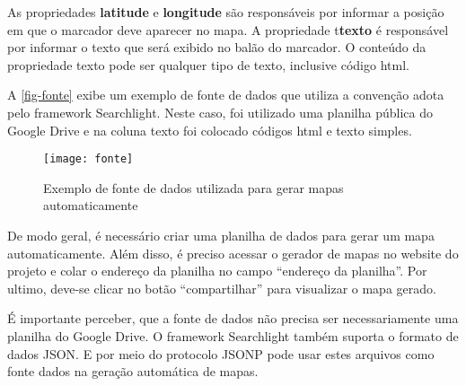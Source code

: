 As propriedades \textbf{latitude} e \textbf{longitude} são responsáveis por informar a posição em que o marcador deve aparecer no mapa. A propriedade t\textbf{texto} é responsável por informar o texto que será exibido no balão do marcador. O conteúdo da propriedade texto pode ser qualquer tipo de texto, inclusive código html.

 A \autoref{fig-fonte} exibe um exemplo de fonte de dados que utiliza a convenção adota pelo framework Searchlight. Neste caso, foi utilizado uma planilha pública do Google Drive e na coluna texto foi colocado  códigos html e texto simples. 		
  
 \begin{figure}[htb]
	\caption{\label{fig-fonte}Exemplo de fonte de dados utilizada para gerar mapas automaticamente}
	\begin{center}
	    \texttt{[image: fonte]}
	\end{center}
\end{figure}

De modo geral, é necessário criar uma planilha de dados para  gerar um mapa automaticamente. Além disso, é preciso acessar o gerador de mapas no website do projeto e colar o endereço  da planilha no campo ``endereço da planilha''. Por ultimo, deve-se clicar no botão ``compartilhar'' para visualizar o mapa gerado.

É importante perceber, que a fonte de dados não precisa ser necessariamente uma planilha do Google Drive. O framework Searchlight também suporta o formato de dados JSON. E por meio do protocolo JSONP pode usar estes arquivos como fonte dados na geração automática de mapas.  
